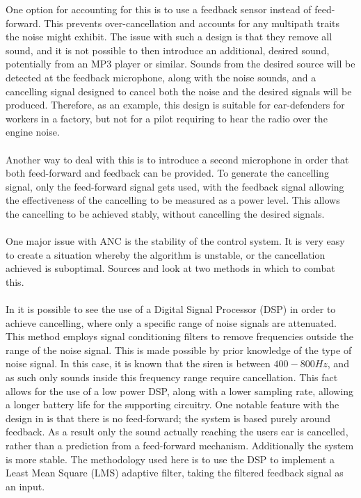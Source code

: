 One option for accounting for this is to use a feedback sensor instead of feed-forward.
This prevents over-cancellation and accounts for any multipath traits the noise might exhibit.
The issue with such a design is that they remove all sound, and it is not possible to then introduce an additional, desired sound, potentially from an MP3 player or similar.
Sounds from the desired source will be detected at the feedback microphone, along with the noise sounds, and a cancelling signal designed to cancel both the noise and the desired signals will be produced.
Therefore, as an example, this design is suitable for ear-defenders for workers in a factory, but not for a pilot requiring to hear the radio over the engine noise.
\\
\\
Another way to deal with this is to introduce a second microphone \cite{EMNoiseCancel,2SensorANCAlg} in order that both feed-forward and feedback can be provided.
To generate the cancelling signal, only the feed-forward signal gets used, with the feedback signal allowing the effectiveness of the cancelling to be measured as a power level.
This allows the cancelling to be achieved stably, without cancelling the desired signals.
\\
\\
One major issue with ANC is the stability of the control system.
It is very easy to create a situation whereby the algorithm is unstable, or the cancellation achieved is suboptimal.
Sources \cite{AuralEnvironmentAdjANC} and \cite{ANCOptimalControlInf} look at two methods in which to combat this.
\\
\\
In \cite{EMHeadsets} it is possible to see the use of a Digital Signal Processor (DSP) in order to achieve cancelling, where only a specific range of noise signals are attenuated.
This method employs signal conditioning filters to remove frequencies outside the range of the noise signal.
This is made possible by prior knowledge of the type of noise signal.
In this case, it is known that the siren is between $400-800Hz$, and as such only sounds inside this frequency range require cancellation.
This fact allows for the use of a low power DSP, along with a lower sampling rate, allowing a longer battery life for the supporting circuitry.
One notable feature with the design in \cite{EMHeadsets} is that there is no feed-forward; the system is based purely around feedback.
As a result only the sound actually reaching the users ear is cancelled, rather than a prediction from a feed-forward mechanism.
Additionally the system is more stable.
The methodology used here is to use the DSP to implement a Least Mean Square (LMS) adaptive filter, taking the filtered feedback signal as an input.

